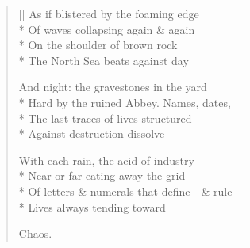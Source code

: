 \label{ch:chaos_theory}
\settowidth{\versewidth}{Of letters \& numerals that define---\& rule---}
\begin{verse}[\versewidth]
As if blistered by the foaming edge\\*
Of waves collapsing again \& again\\*
On the shoulder of brown rock\\*
The North Sea beats against day

And night: the gravestones in the yard\\*
Hard by the ruined Abbey.  Names, dates,\\*
The last traces of lives structured\\*
Against destruction dissolve

With each rain, the acid of industry\\*
Near or far eating away the grid\\*
Of letters \& numerals that define---\& rule---\\*
Lives always tending toward

Chaos.
\end{verse}
